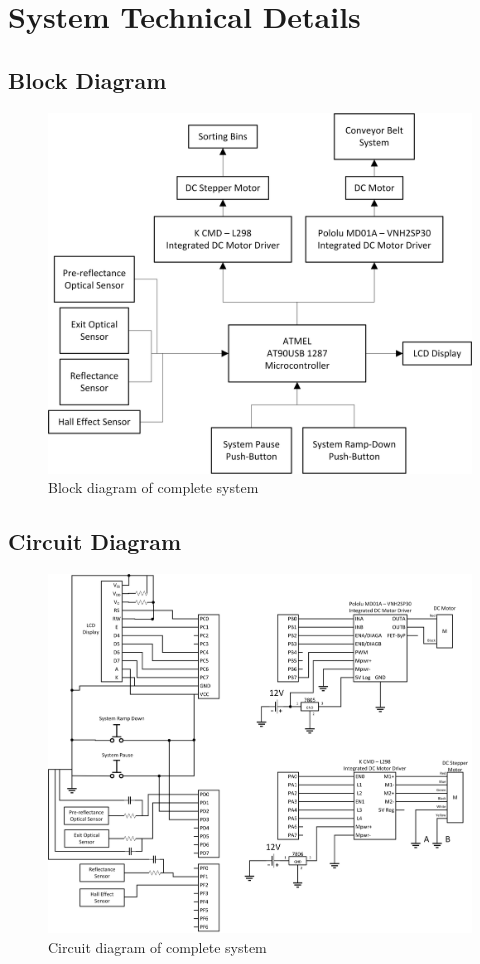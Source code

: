 \section{System Technical Details}\label{sec:flowchart}
\subsection{Block Diagram}
\begin{figure}[tbph]
	\centering
	\includegraphics[width=0.8\linewidth]{"images/block_diagram"}
	\caption{Block diagram of complete system}
	\label{fig:ABCD}
\end{figure}
\newpage
\subsection{Circuit Diagram}
\begin{figure}[tbph]
	\centering
	\includegraphics[width=1\linewidth]{"images/circuit"}
	\caption{Circuit diagram of complete system}
	\label{fig:circuit}
\end{figure}
\newpage
